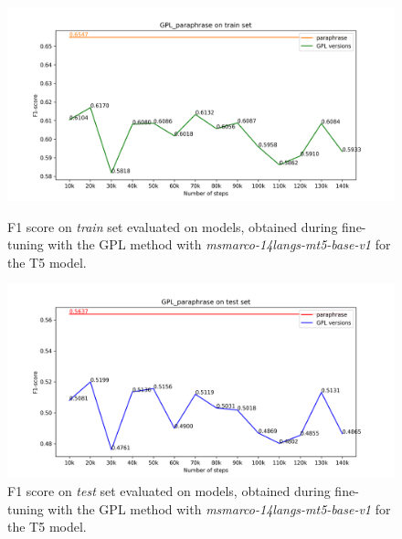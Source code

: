 \documentclass[fleqn,moreauthors,10pt]{ds_report}
\begin{document}
\begin{figure}[h]
    \centering
    \begin{minipage}{0.5\textwidth}
        \centering
        \includegraphics[width=\linewidth]{GPL__paraphrase_train.png}
        \caption{F1 score on \textit{train} set evaluated on models, obtained during fine-tuning with the GPL method with {\it msmarco-14langs-mt5-base-v1} \cite{msmarco14langs} for the T5 model.}
		\label{fig:gpl-versions-train}
    \end{minipage}\hfill
    \begin{minipage}{0.5\textwidth}
        \centering
        \includegraphics[width=\linewidth]{GPL__paraphrase_test.png}
        \caption{F1 score on \textit{test} set evaluated on models, obtained during fine-tuning with the GPL method with {\it msmarco-14langs-mt5-base-v1} \cite{msmarco14langs} for the T5 model.}
		\label{fig:gpl-versions}
    \end{minipage}
\end{figure}
\end{document}
